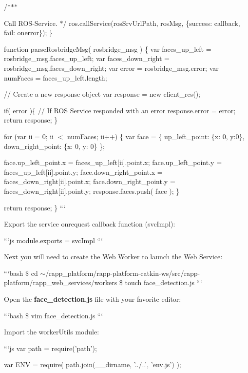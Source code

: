 /$\ast$$\ast$$\ast$
\begin{DoxyItemize}
\item Call R\-O\-S-\/\-Service. $\ast$/ ros.\-call\-Service(ros\-Srv\-Url\-Path, ros\-Msg, \{success\-: callback, fail\-: onerror\}); \}
\end{DoxyItemize}

function parse\-Rosbridge\-Msg( rosbridge\-\_\-msg ) \{ var faces\-\_\-up\-\_\-left = rosbridge\-\_\-msg.\-faces\-\_\-up\-\_\-left; var faces\-\_\-down\-\_\-right = rosbridge\-\_\-msg.\-faces\-\_\-down\-\_\-right; var error = rosbridge\-\_\-msg.\-error; var num\-Faces = faces\-\_\-up\-\_\-left.\-length;

// Create a new response object var response = new client\-\_\-res();

if( error )\{ // If R\-O\-S Service responded with an error response.\-error = error; return response; \}

for (var ii = 0; ii $<$ num\-Faces; ii++) \{ var face = \{ up\-\_\-left\-\_\-point\-: \{x\-: 0, y\-:0\}, down\-\_\-right\-\_\-point\-: \{x\-: 0, y\-: 0\} \};

face.\-up\-\_\-left\-\_\-point.\-x = faces\-\_\-up\-\_\-left\mbox{[}ii\mbox{]}.point.\-x; face.\-up\-\_\-left\-\_\-point.\-y = faces\-\_\-up\-\_\-left\mbox{[}ii\mbox{]}.point.\-y; face.\-down\-\_\-right\-\_\-point.\-x = faces\-\_\-down\-\_\-right\mbox{[}ii\mbox{]}.point.\-x; face.\-down\-\_\-right\-\_\-point.\-y = faces\-\_\-down\-\_\-right\mbox{[}ii\mbox{]}.point.\-y; response.\-faces.\-push( face ); \}

return response; \} ```

Export the service onrequest callback function ({\ttfamily svc\-Impl})\-:

```js module.\-exports = svc\-Impl ```

Next you will need to create the Web Worker to launch the Web Service\-:

```bash \$ cd $\sim$/rapp\-\_\-platform/rapp-\/platform-\/catkin-\/ws/src/rapp-\/platform/rapp\-\_\-web\-\_\-services/workers \$ touch face\-\_\-detection.\-js ```

Open the {\bfseries face\-\_\-detection.\-js} file with your favorite editor\-:

```bash \$ vim face\-\_\-detection.\-js ```

Import the worker\-Utils module\-:

```js var path = require('path');

var E\-N\-V = require( path.\-join(\-\_\-\-\_\-dirname, '../..', 'env.\-js') );

